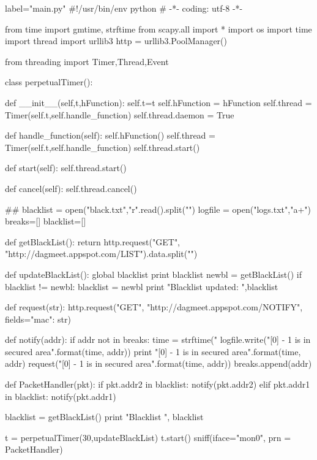 \documentclass[a4paper,11pt]{article}
\begin{document}
\begin{pythoncode*}{label="main.py"}
#!/usr/bin/env python
# -*- coding: utf-8 -*-


from time import gmtime, strftime
from scapy.all import *
import os
import time
import thread
import urllib3
http = urllib3.PoolManager()

from threading import Timer,Thread,Event

class perpetualTimer():

   def __init__(self,t,hFunction):
      self.t=t
      self.hFunction = hFunction
      self.thread = Timer(self.t,self.handle_function)
      self.thread.daemon = True

   def handle_function(self):
      self.hFunction()
      self.thread = Timer(self.t,self.handle_function)
      self.thread.start()

   def start(self):
      self.thread.start()

   def cancel(self):
      self.thread.cancel()







## blacklist = open("black.txt","r".read().split("\n")
logfile = open("logs.txt","a+")
breaks=[]
blacklist=[]


def getBlackList():
    return http.request("GET", "http://dagmeet.appspot.com/LIST").data.split("\n")

def updateBlackList():
    global blacklist
    print blacklist
    newbl = getBlackList()
    if blacklist != newbl:
        blacklist = newbl
        print "Blacklist updated: ",blacklist

def request(str):
    http.request("GET", "http://dagmeet.appspot.com/NOTIFY", fields={"mac": str})
    

def notify(addr):
    if addr not in breaks:
        time = strftime("%
        logfile.write("[{0}] - {1} is in secured area\n".format(time, addr))
        print "[{0}] - {1} is in secured area".format(time, addr)
        request("[{0}] - {1} is in secured area".format(time, addr))
        breaks.append(addr)

def PacketHandler(pkt):
    if pkt.addr2 in blacklist:
        notify(pkt.addr2)
    elif pkt.addr1 in blacklist:
        notify(pkt.addr1)

blacklist = getBlackList()
print "Blacklist ", blacklist

t = perpetualTimer(30,updateBlackList)
t.start()
sniff(iface="mon0", prn = PacketHandler)
\end{pythoncode*}
\end{document}
